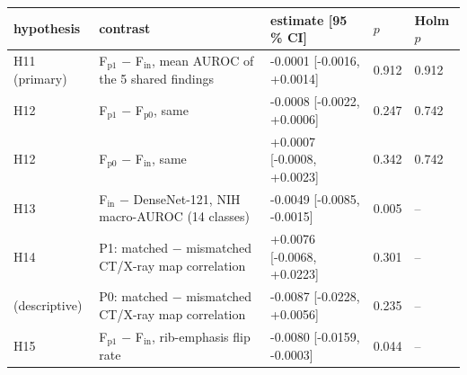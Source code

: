 \begin{tabular}{lllll}
\toprule
hypothesis & contrast & estimate [95\,\% CI] & $p$ & Holm $p$ \\
\midrule
H11 (primary) & F$_\mathrm{p1}$ $-$ F$_\mathrm{in}$, mean AUROC of the 5 shared findings & -0.0001 [-0.0016, +0.0014] & 0.912 & 0.912 \\
H12 & F$_\mathrm{p1}$ $-$ F$_\mathrm{p0}$, same & -0.0008 [-0.0022, +0.0006] & 0.247 & 0.742 \\
H12 & F$_\mathrm{p0}$ $-$ F$_\mathrm{in}$, same & +0.0007 [-0.0008, +0.0023] & 0.342 & 0.742 \\
H13 & F$_\mathrm{in}$ $-$ DenseNet-121, NIH macro-AUROC (14 classes) & -0.0049 [-0.0085, -0.0015] & 0.005 & -- \\
H14 & P1: matched $-$ mismatched CT/X-ray map correlation & +0.0076 [-0.0068, +0.0223] & 0.301 & -- \\
(descriptive) & P0: matched $-$ mismatched CT/X-ray map correlation & -0.0087 [-0.0228, +0.0056] & 0.235 & -- \\
H15 & F$_\mathrm{p1}$ $-$ F$_\mathrm{in}$, rib-emphasis flip rate & -0.0080 [-0.0159, -0.0003] & 0.044 & -- \\
\bottomrule
\end{tabular}
